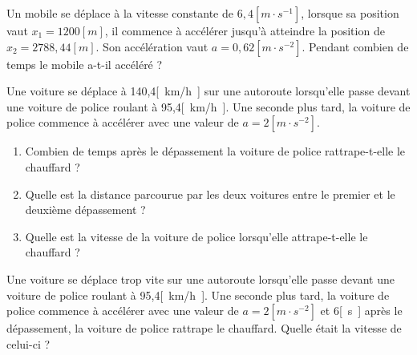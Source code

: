 \begin{exercise}
  Un mobile se déplace à la vitesse constante de \(6,4[m \cdot s^{-1}]\), lorsque sa position vaut \(x_1=1200[m]\), il commence à accélérer jusqu'à atteindre la position de \(x_2=2788,44[m]\). Son accélération vaut \(a=0,62\unit{[m \cdot s^{-2}]}\).
  Pendant combien de temps le mobile a-t-il accéléré ?
\end{exercise}

\begin{exercise}[difficulty=***]
  Une voiture se déplace à 140,4\unit{[km/h]} sur une autoroute lorsqu'elle passe devant une voiture de police roulant à 95,4\unit{[km/h]}. Une seconde plus tard, la voiture de police commence à accélérer avec une valeur de \(a=2\unit{[m \cdot s^{-2}]}\).
  \begin{enumerate}[label=\alph*)]
    \item Combien de temps après le dépassement la voiture de police rattrape-t-elle le chauffard ?
    \item Quelle est la distance parcourue par les deux voitures entre le premier et le deuxième dépassement ?
    \item Quelle est la vitesse de la voiture de police lorsqu'elle attrape-t-elle le chauffard ?
  \end{enumerate}
\end{exercise}

\begin{exercise}[difficulty=***]
  Une voiture se déplace trop vite sur une autoroute lorsqu'elle passe devant une voiture de police roulant à 95,4\unit{[km/h]}. Une seconde plus tard, la voiture de police commence à accélérer avec une valeur de \(a=2\unit{[m \cdot s^{-2}]}\) et 6\unit{[s]} après le dépassement, la voiture de police rattrape le chauffard.
  Quelle était la vitesse de celui-ci ?
\end{exercise}

